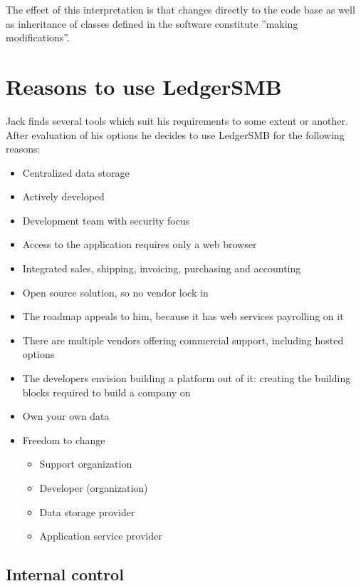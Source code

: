 The effect of this interpretation is that changes directly to the code base as
well as inheritance of classes defined in the software constitute ''making modifications''.

\chapter{Reasons to use LedgerSMB}
\label{cha-advocacy}

Jack finds several tools which suit his requirements to some extent or another.
After evaluation of his options he decides to use LedgerSMB for the following reasons:

\begin{itemize}
\item Centralized data storage
\item Actively developed
\item Development team with security focus
\item Access to the application requires only a web browser
\item Integrated sales, shipping, invoicing, purchasing and accounting
\item Open source solution, so no vendor lock in
\item The roadmap appeals to him, because it has web services payrolling on it
\item There are multiple vendors offering commercial support, including hosted options
\item The developers envision building a platform out of it: creating the building blocks
required to build a company on
\end{itemize}


\begin{itemize}
\item Own your own data
\item Freedom to change
	\begin{itemize}
	\item Support organization
	\item Developer (organization)
	\item Data storage provider
	\item Application service provider
	\end{itemize}
\end{itemize}

\section{Internal control}
\label{sec-advocacy-internal-control}

